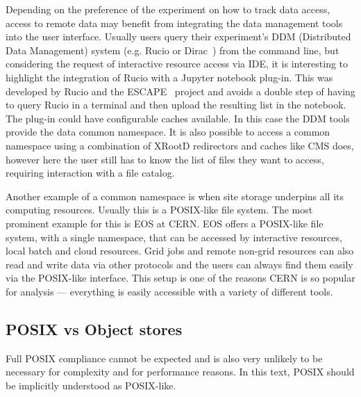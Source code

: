 Depending on the preference of the experiment on how to track data access, access to remote data may benefit from integrating the data management tools into the user interface. Usually users query their experiment’s DDM (Distributed Data Management) system  (e.g. Rucio or Dirac~\cite{dirac}) from the command line, but considering the request of interactive resource access via IDE, it is interesting to highlight the integration of Rucio with a Jupyter notebook plug-in. This was developed by Rucio and the ESCAPE~\cite{escape} project and avoids a double step of having to query Rucio in a terminal and then upload the resulting list in the notebook. The plug-in could have configurable caches available. In this case the DDM tools provide the data common namespace. It is also possible to access a common namespace using a combination of XRootD redirectors and caches like CMS does, however here the user still has to know the list of files they want to access, requiring interaction with a file catalog. 

Another example of a common namespace is when site storage underpins all its computing resources. Usually this is a POSIX-like file system. The most prominent example for this is EOS at CERN. EOS offers a POSIX-like file system, with a single namespace, that can be accessed by interactive resources, local batch and cloud resources. Grid jobs and remote non-grid resources can also read and write data via other protocols and the users can always find them easily via the POSIX-like interface. This setup is one of the reasons CERN is so popular for analysis --- everything is easily accessible with a variety of different tools.

\subsection*{POSIX vs Object stores}

Full POSIX compliance cannot be expected and is also very unlikely to be necessary  for complexity and for performance reasons. In this text, POSIX should be implicitly understood as POSIX-like.

